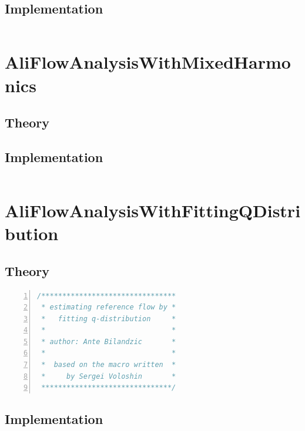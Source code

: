 \documentclass[a4paper]{book}
\numberwithin{equation}{subsection}
\begin{document}
\subsection{Implementation}
\begin{lstlisting}[language=C, numbers=left]

\end{lstlisting}

\section{AliFlowAnalysisWithMixedHarmonics}
\subsection{Theory}
\subsection{Implementation}
\begin{lstlisting}[language=C, numbers=left]

\end{lstlisting}

\section{AliFlowAnalysisWithFittingQDistribution}
\subsection{Theory}
\begin{lstlisting}[language=C, numbers=left]
/******************************** 
 * estimating reference flow by *
 *   fitting q-distribution     * 
 *                              *
 * author: Ante Bilandzic       * 
 *                              *  
 *  based on the macro written  *
 *     by Sergei Voloshin       *
 *******************************/  \end{lstlisting}
\subsection{Implementation}
\begin{lstlisting}[language=C, numbers=left]

\end{lstlisting}
\end{document}
